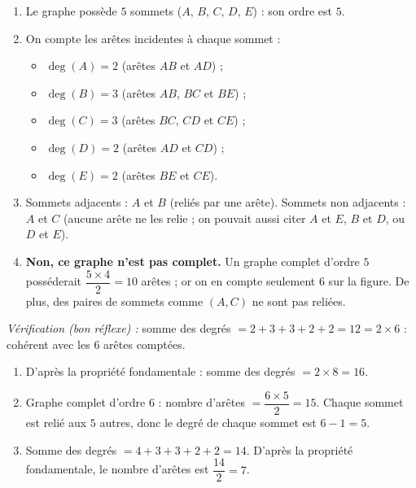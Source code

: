 \documentclass[11pt]{article}
\newcommand{\cle}[1]{{\popxbold\color{popdark}#1}}
\newcounter{popsec}
\newcounter{popsub}
\newcommand{\courssub}[1]{%
  \stepcounter{popsub}%
  \par\vspace{9pt}\noindent{\popxbold\fontsize{11.5}{13}\selectfont\color{popink}{\color{poporange}\thepopsec.\thepopsub}\hspace{6pt}#1}\par\nopagebreak\vspace{4pt}
}
\begin{document}
\begin{corrige}
\begin{enumerate}
\item Le graphe possède $5$ sommets ($A$, $B$, $C$, $D$, $E$) : son \cle{ordre} est $5$.
\item On compte les arêtes incidentes à chaque sommet :
\begin{itemize}
\item $\deg(A) = 2$ (arêtes $AB$ et $AD$) ;
\item $\deg(B) = 3$ (arêtes $AB$, $BC$ et $BE$) ;
\item $\deg(C) = 3$ (arêtes $BC$, $CD$ et $CE$) ;
\item $\deg(D) = 2$ (arêtes $AD$ et $CD$) ;
\item $\deg(E) = 2$ (arêtes $BE$ et $CE$).
\end{itemize}
\item Sommets adjacents : $A$ et $B$ (reliés par une arête). Sommets non adjacents : $A$ et $C$ (aucune arête ne les relie ; on pouvait aussi citer $A$ et $E$, $B$ et $D$, ou $D$ et $E$).
\item \textbf{Non, ce graphe n'est pas complet.} Un graphe complet d'ordre $5$ posséderait $\dfrac{5\times 4}{2} = 10$ arêtes ; or on en compte seulement $6$ sur la figure. De plus, des paires de sommets comme $(A, C)$ ne sont pas reliées.
\end{enumerate}
\emph{Vérification (bon réflexe) :} somme des degrés $= 2+3+3+2+2 = 12 = 2 \times 6$ : cohérent avec les $6$ arêtes comptées.
\end{corrige}

\begin{corrige}
\begin{enumerate}
\item D'après la propriété fondamentale : somme des degrés $= 2 \times 8 = 16$.
\item Graphe complet d'ordre $6$ : nombre d'arêtes $= \dfrac{6 \times 5}{2} = 15$. Chaque sommet est relié aux $5$ autres, donc le degré de chaque sommet est $6 - 1 = 5$.
\item Somme des degrés $= 4 + 3 + 3 + 2 + 2 = 14$. D'après la propriété fondamentale, le nombre d'arêtes est $\dfrac{14}{2} = 7$.
\end{enumerate}
\end{corrige}

\courssub{Je m'entraîne}
\end{document}
